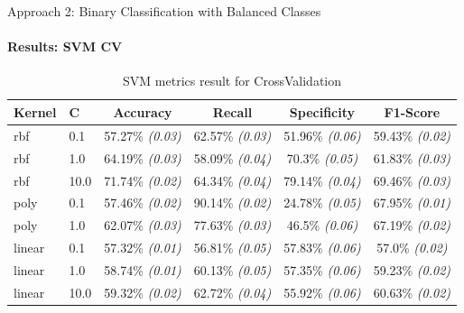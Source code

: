 \documentclass[9pt, pstricks, xcolor=dvipsnames]{beamer}
\begin{document}
\begin{frame}{Approach 2: Binary Classification
with Balanced Classes}
\framesubtitle{Results: SVM CV}
\begin{table}[H]
\centering
\begin{tabular}{llcccc}
\toprule
Kernel & C & Accuracy & Recall & Specificity & F1-Score \\
\midrule
rbf & 0.1 & 57.27\% \textit{(0.03)} & 62.57\% \textit{(0.03)} & 51.96\% \textit{(0.06)} & 59.43\% \textit{(0.02)} \\
rbf & 1.0 & 64.19\% \textit{(0.03)} & 58.09\% \textit{(0.04)} & 70.3\% \textit{(0.05)} & 61.83\% \textit{(0.03)} \\
rbf & 10.0 & 71.74\% \textit{(0.02)} & 64.34\% \textit{(0.04)} & 79.14\% \textit{(0.04)} & 69.46\% \textit{(0.03)} \\
poly & 0.1 & 57.46\% \textit{(0.02)} & 90.14\% \textit{(0.02)} & 24.78\% \textit{(0.05)} & 67.95\% \textit{(0.01)} \\
poly & 1.0 & 62.07\% \textit{(0.03)} & 77.63\% \textit{(0.03)} & 46.5\% \textit{(0.06)} & 67.19\% \textit{(0.02)} \\
linear & 0.1 & 57.32\% \textit{(0.01)} & 56.81\% \textit{(0.05)} & 57.83\% \textit{(0.06)} & 57.0\% \textit{(0.02)} \\
linear & 1.0 & 58.74\% \textit{(0.01)} & 60.13\% \textit{(0.05)} & 57.35\% \textit{(0.06)} & 59.23\% \textit{(0.02)} \\
linear & 10.0 & 59.32\% \textit{(0.02)} & 62.72\% \textit{(0.04)} & 55.92\% \textit{(0.06)} & 60.63\% \textit{(0.02)} \\
\bottomrule
\end{tabular}
\caption{SVM metrics result for CrossValidation}
\label{tab:SVM_CV_approach2}
\end{table}
\end{frame}
\end{document}
